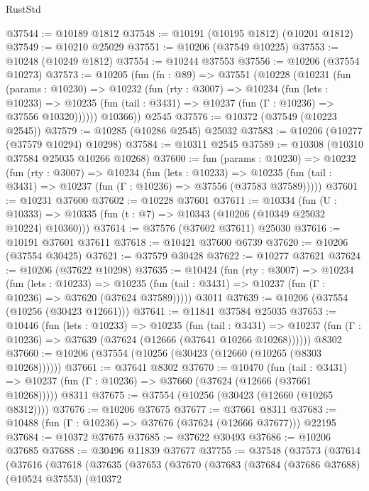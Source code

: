 \begin{lexlean}{RustStd}
\begin{coremodule}
@37544 := @10189 @1812
@37548 := @10191 (@10195 @1812) (@10201 @1812)
@37549 := @10210 @25029
@37551 := @10206 (@37549 @10225)
@37553 := @10248 (@10249 @1812)
@37554 := @10244 @37553
@37556 := @10206 (@37554 @10273)
@37573 := @10205
    (fun (fn : @89) =>
    @37551
      (@10228
        (@10231
          (fun (params : @10230) =>
          @10232
            (fun (rty : @3007) =>
            @10234
              (fun (lets : @10233) =>
              @10235 (fun (tail : @3431) => @10237 (fun (Γ : @10236) => @37556 @10320))))))
        @10366))
    @2545
@37576 := @10372 (@37549 (@10223 @2545))
@37579 := @10285 (@10286 @2545) @25032
@37583 := @10206 (@10277 (@37579 @10294) @10298)
@37584 := @10311 @2545
@37589 := @10308 (@10310 @37584 @25035 @10266 @10268)
@37600 := fun (params : @10230) =>
  @10232
    (fun (rty : @3007) =>
    @10234
      (fun (lets : @10233) =>
      @10235 (fun (tail : @3431) => @10237 (fun (Γ : @10236) => @37556 (@37583 @37589)))))
@37601 := @10231 @37600
@37602 := @10228 @37601
@37611 := @10334
    (fun (U : @10333) => @10335 (fun (t : @7) => @10343 (@10206 (@10349 @25032 @10224) @10360)))
@37614 := @37576 (@37602 @37611) @25030
@37616 := @10191 @37601 @37611
@37618 := @10421 @37600 @6739
@37620 := @10206 (@37554 @30425)
@37621 := @37579 @30428
@37622 := @10277 @37621
@37624 := @10206 (@37622 @10298)
@37635 := @10424
    (fun (rty : @3007) =>
    @10234
      (fun (lets : @10233) =>
      @10235 (fun (tail : @3431) => @10237 (fun (Γ : @10236) => @37620 (@37624 @37589)))))
    @3011
@37639 := @10206 (@37554 (@10256 (@30423 @12661)))
@37641 := @11841 @37584 @25035
@37653 := @10446
    (fun (lets : @10233) =>
    @10235
      (fun (tail : @3431) =>
      @10237 (fun (Γ : @10236) => @37639 (@37624 (@12666 (@37641 @10266 @10268))))))
    @8302
@37660 := @10206 (@37554 (@10256 (@30423 (@12660 (@10265 (@8303 @10268))))))
@37661 := @37641 @8302
@37670 := @10470
    (fun (tail : @3431) => @10237 (fun (Γ : @10236) => @37660 (@37624 (@12666 (@37661 @10268)))))
    @8311
@37675 := @37554 (@10256 (@30423 (@12660 (@10265 @8312))))
@37676 := @10206 @37675
@37677 := @37661 @8311
@37683 := @10488 (fun (Γ : @10236) => @37676 (@37624 (@12666 @37677))) @22195
@37684 := @10372 @37675
@37685 := @37622 @30493
@37686 := @10206 @37685
@37688 := @30496 @11839 @37677
@37755 := @37548
    (@37573
      (@37614
        (@37616
          (@37618
            (@37635
              (@37653
                (@37670
                  (@37683
                    (@37684
                      (@37686 @37688)
                      (@10524 @37553)
                      (@10372

\end{coremodule}
\end{lexlean}
